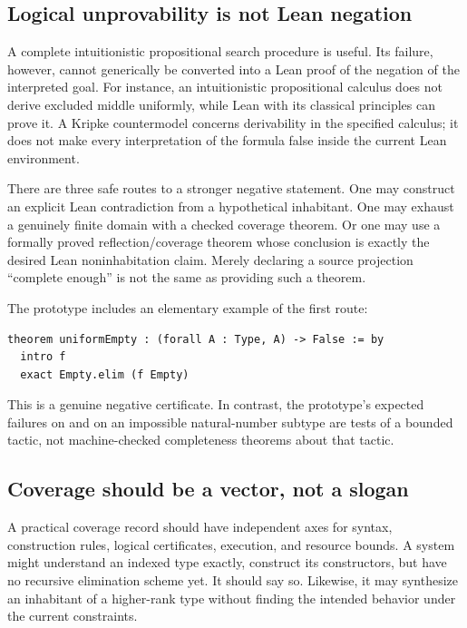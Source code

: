 \subsection{Logical unprovability is not Lean negation}

A complete intuitionistic propositional search procedure is useful. Its failure, however, cannot generically be converted into a Lean proof of the negation of the interpreted goal. For instance, an intuitionistic propositional calculus does not derive excluded middle uniformly, while Lean with its classical principles can prove it. A Kripke countermodel concerns derivability in the specified calculus; it does not make every interpretation of the formula false inside the current Lean environment.

There are three safe routes to a stronger negative statement. One may construct an explicit Lean contradiction from a hypothetical inhabitant. One may exhaust a genuinely finite domain with a checked coverage theorem. Or one may use a formally proved reflection/coverage theorem whose conclusion is exactly the desired Lean noninhabitation claim. Merely declaring a source projection ``complete enough'' is not the same as providing such a theorem.

The prototype includes an elementary example of the first route:
\par\noindent\begin{minipage}{\linewidth}
\begin{lstlisting}
theorem uniformEmpty : (forall A : Type, A) -> False := by
  intro f
  exact Empty.elim (f Empty)
\end{lstlisting}
\end{minipage}\par
This is a genuine negative certificate. In contrast, the prototype's expected failures on  and on an impossible natural-number subtype are tests of a bounded tactic, not machine-checked completeness theorems about that tactic.

\subsection{Coverage should be a vector, not a slogan}

A practical coverage record should have independent axes for syntax, construction rules, logical certificates, execution, and resource bounds. A system might understand an indexed type exactly, construct its constructors, but have no recursive elimination scheme yet. It should say so. Likewise, it may synthesize an inhabitant of a higher-rank type without finding the intended behavior under the current constraints.

